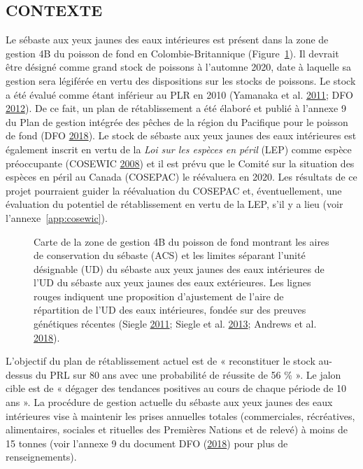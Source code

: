 \documentclass[11pt]{book}
\begin{document}
\hypertarget{sec:introduction-background}{%
\subsection{CONTEXTE}\label{sec:introduction-background}}

Le sébaste aux yeux jaunes des eaux intérieures est présent dans la zone de gestion 4B du poisson de fond en Colombie-Britannique (Figure~\ref{fig:map-4B}). Il devrait être désigné comme grand stock de poissons à l'automne 2020, date à laquelle sa gestion sera légiférée en vertu des dispositions sur les stocks de poissons. Le stock a été évalué comme étant inférieur au PLR en 2010 (Yamanaka et al. \protect\hyperlink{ref-yamanaka2011}{2011}; DFO \protect\hyperlink{ref-dfo2012}{2012}). De ce fait, un plan de rétablissement a été élaboré et publié à l'annexe 9 du Plan de gestion intégrée des pêches de la région du Pacifique pour le poisson de fond (DFO \protect\hyperlink{ref-ifmp2018}{2018}). Le stock de sébaste aux yeux jaunes des eaux intérieures est également inscrit en vertu de la \emph{Loi sur les espèces en péril} (LEP) comme espèce préoccupante (COSEWIC \protect\hyperlink{ref-cosewic2008}{2008}) et il est prévu que le Comité sur la situation des espèces en péril au Canada (COSEPAC) le réévaluera en 2020. Les résultats de ce projet pourraient guider la réévaluation du COSEPAC et, éventuellement, une évaluation du potentiel de rétablissement en vertu de la LEP, s'il y a lieu (voir l'annexe~\ref{app:cosewic}).


\begin{figure}[htb]

{\centering {} 

}

\caption{Carte de la zone de gestion 4B du poisson de fond montrant les aires de conservation du sébaste (ACS) et les limites séparant l'unité désignable (UD) du sébaste aux yeux jaunes des eaux intérieures de l'UD du sébaste aux yeux jaunes des eaux extérieures. Les lignes rouges indiquent une proposition d'ajustement de l'aire de répartition de l'UD des eaux intérieures, fondée sur des preuves génétiques récentes (Siegle \protect\hyperlink{ref-siegle2011}{2011}; Siegle et al. \protect\hyperlink{ref-siegle2013}{2013}; Andrews et al. \protect\hyperlink{ref-andrews2018}{2018}).}\label{fig:map-4B}
\end{figure}
L'objectif du plan de rétablissement actuel est de « reconstituer le stock au-dessus du PRL sur 80 ans avec une probabilité de réussite de 56 \% ». Le jalon cible est de « dégager des tendances positives au cours de chaque période de 10 ans ». La procédure de gestion actuelle du sébaste aux yeux jaunes des eaux intérieures vise à maintenir les prises annuelles totales (commerciales, récréatives, alimentaires, sociales et rituelles des Premières Nations et de relevé) à moins de 15 tonnes (voir l'annexe 9 du document DFO (\protect\hyperlink{ref-ifmp2018}{2018}) pour plus de renseignements).
\end{document}
